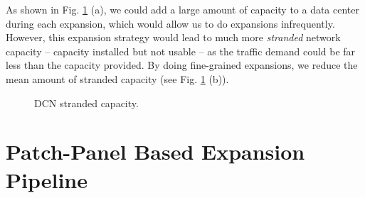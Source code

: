 \documentclass[letterpaper,twocolumn,10pt]{article}
\begin{document}
As shown in Fig. \ref{dcnstrandedcapacity} (a), we could add a large amount of capacity to a data center during each expansion, which would allow us to do expansions infrequently. However, this expansion strategy would lead to much more \emph{stranded} network capacity -- capacity installed but not usable -- as the traffic demand could be far less than the capacity provided.  By doing fine-grained expansions, we reduce the mean amount of stranded capacity (see Fig. \ref{dcnstrandedcapacity} (b)).
\begin{figure}[ht]
 \centering
\vspace{-1ex}
 \caption{DCN stranded capacity.}\label{dcnstrandedcapacity}
\end{figure}\section{Patch-Panel Based Expansion Pipeline}
\label{PipelineSection}
\end{document}
